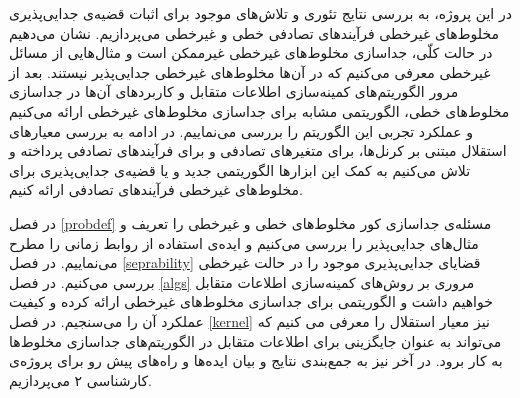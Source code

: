 در این پروژه، به بررسی نتایج تئوری و تلاش‌های موجود برای اثبات قضیه‌ی جدایی‌پذیری مخلوط‌های غیرخطی فرآیند‌های تصادفی خطی و غیرخطی می‌پردازیم. نشان می‌دهیم در حالت کلّی، جداسازی مخلوط‌های غیرخطی غیرممکن است و مثال‌هایی از مسائل غیرخطی معرفی می‌کنیم که در آن‌ها مخلوط‌های غیرخطی جدایی‌پذیر نیستند. بعد از مرور الگوریتم‌های کمینه‌سازی اطلاعات متقابل و کاربرد‌های آن‌ها در جداسازی مخلوط‌های خطی، الگوریتمی مشابه برای جداسازی مخلوط‌های غیرخطی ارائه می‌کنیم و عملکرد تجربی این الگوریتم را بررسی می‌نماییم. در ادامه به بررسی معیار‌های استقلال مبتنی بر کرنل‌ها، برای متغیر‌های تصادفی و برای فرآیند‌های تصادفی پرداخته و تلاش می‌کنیم به کمک این ابزار‌ها الگوریتمی جدید و یا قضیه‌ی جدایی‌پذیر‌ی برای مخلوط‌های غیرخطی فرآیند‌های تصادفی ارائه کنیم.

در فصل 
\ref{probdef}
 مسئله‌ی جداسازی کور مخلوط‌های خطی و  غیرخطی را تعریف  و مثال‌های جدایی‌پذیر را بررسی می‌کنیم و ایده‌ی استفاده از روابط زمانی را مطرح می‌نماییم. در فصل 
 \ref{seprability}
قضایای جدایی‌پذیری موجود را در حالت غیرخطی بررسی می‌کنیم. در  فصل
\ref{algs}
مروری بر روش‌های کمینه‌سازی اطلاعات متقابل خواهیم داشت و الگوریتمی برای جداسازی مخلوط‌های غیرخطی ارائه کرده و کیفیت عملکرد آن را می‌سنجیم. در فصل
\ref{kernel}
نیز معیار استقلال
را معرفی می کنیم که می‌تواند به عنوان جایگزینی برای اطلاعات متقابل در الگوریتم‌های جداسازی مخلوط‌ها به کار برود. در آخر نیز به جمع‌بندی نتایج و بیان ایده‌ها و راه‌های پیش رو برای  پروژه‌ی کارشناسی ۲ می‌پردازیم.


